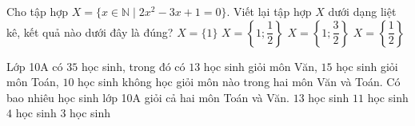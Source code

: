\begin{ex} %
	Cho tập hợp $X=\{x \in \mathbb{N}\mid 2x^2-3x+1=0 \}$. Viết lại tập hợp $X$ dưới dạng liệt kê,  kết quả nào dưới đây là đúng? 
	\choice
	{\True $X=\{1\}$}
	{$X=\left\{1;\dfrac 12\right\}$}
	{$X=\left\{1;\dfrac 32\right\}$}
	{$X=\left\{\dfrac 12\right\}$}
\end{ex}
\begin{ex}%
	Lớp 10A có $35$ học sinh, trong đó có $13$ học sinh giỏi môn Văn, $15$ học sinh giỏi môn Toán, $10$ học sinh không học giỏi môn nào trong hai môn Văn và Toán. Có bao nhiêu học sinh lớp 10A giỏi cả hai môn Toán và Văn.
	\choice
	{$13$ học sinh}
	{$11$ học sinh}
	{$4$ học sinh}
	{\True $3$ học sinh}
\end{ex}

